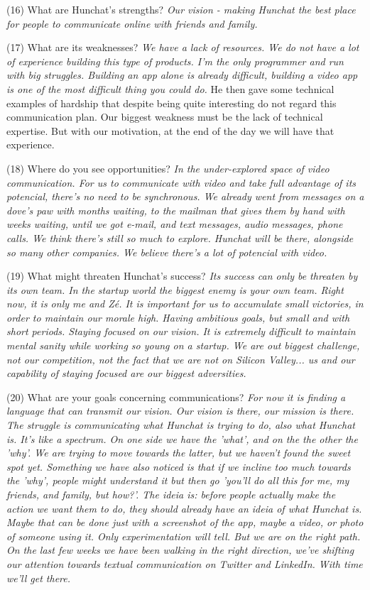 \documentclass[12pt]{article}
\begin{document}
(16) What are Hunchat’s strengths? \textit{Our vision - making Hunchat the best place for people to communicate online with friends and family.}

(17) What are its weaknesses? \textit{We have a lack of resources. We do not have a lot of experience building this type of products. I'm the only programmer and run with big struggles. Building an app alone is already difficult, building a video app is one of the most difficult thing you could do.} He then gave some technical examples of hardship that despite being quite interesting do not regard this communication plan. {Our biggest weakness must be the lack of technical expertise. But with our motivation, at the end of the day we will have that experience.}

(18) Where do you see opportunities? \textit{In the under-explored space of video communication. For us to communicate with video and take full advantage of its potencial, there's no need to be synchronous. We already went from messages on a dove's paw with months waiting, to the mailman that gives them by hand with weeks waiting, until we got e-mail, and text messages, audio messages, phone calls. We think there's still so much to explore. Hunchat will be there, alongside so many other companies. We believe there's a lot of potencial with video.}

(19) What might threaten Hunchat’s success? \textit{Its success can only be threaten by its own team. In the startup world the biggest enemy is your own team. Right now, it is only me and Zé. It is important for us to accumulate small victories, in order to maintain our morale high. Having ambitious goals, but small and with short periods. Staying focused on our vision. It is extremely difficult to maintain mental sanity while working so young on a startup. We are out biggest challenge, not our competition, not the fact that we are not on Silicon Valley... us and our capability of staying focused are our biggest adversities.}

(20) What are your goals concerning communications? \textit{For now it is finding a language that can transmit our vision. Our vision is there, our mission is there. The struggle is communicating what Hunchat is trying to do, also what Hunchat is. It's like a spectrum. On one side we have the 'what', and on the the other the 'why'. We are trying to move towards the latter, but we haven't found the sweet spot yet. Something we have also noticed is that if we incline too much towards the 'why', people might understand it but then go 'you'll do all this for me, my friends, and family, but how?'. The ideia is: before people actually make the action we want them to do, they should already have an ideia of what Hunchat is. Maybe that can be done just with a screenshot of the app, maybe a video, or photo of someone using it. Only experimentation will tell. But we are on the right path. On the last few weeks we have been walking in the right direction, we've shifting our attention towards textual communication on Twitter and LinkedIn. With time we'll get there.}
\end{document}

